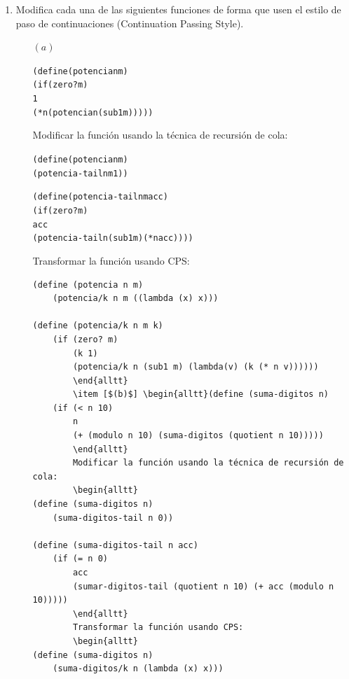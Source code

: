 \documentclass[letterpaper,11pt]{article}
\begin{document}
\begin{enumerate}
    Cuando invocamos nuestra continuación $c$ con un argumento, es equivalente a reemplazar el valor de $4$ por el valor de $c$, y así el valor de la expresión es $21$.\\
    \newpage
    \texttt{Notación $\lambda \uparrow$:}
    \begin{verbatim}
        (+ 1 (+ 2 (+ 3 (+ (let/cc k (set! c k) 4) 5))))
        (+ 1 (+ 2 (+ 3 (+ (lambda \uparrow (k) (k (+ 1 (+ 2 (+ 3 (+ 10 5))))))))))
        (k (+ 1 (+ 2 (+3 (+ 10 5)))))
        (k 21) = 21
    \end{verbatim}
    
    \item Modifica cada una de las siguientes funciones de forma que usen el estilo de paso de continuaciones (Continuation Passing Style).
    \begin{itemize}
        \item [$(a)$] \begin{alltt}(define (potencia n m)
    (if (zero? m)
        1
        (* n (potencia n (sub1 m)))))
        \end{alltt}
        Modificar la función usando la técnica de recursión de cola:
        \begin{alltt}
(define (potencia n m)
    (potencia-tail n m 1))
    
(define (potencia-tail n m acc)
    (if (zero? m)
        acc
        (potencia-tail n (sub1 m) (* n acc))))
        \end{alltt}
        Transformar la función usando CPS:
        \begin{verbatim}
(define (potencia n m)
    (potencia/k n m ((lambda (x) x)))
    
(define (potencia/k n m k)
    (if (zero? m)
        (k 1)
        (potencia/k n (sub1 m) (lambda(v) (k (* n v))))))
        \end{alltt}
        \item [$(b)$] \begin{alltt}(define (suma-digitos n)
    (if (< n 10)
        n
        (+ (modulo n 10) (suma-digitos (quotient n 10)))))
        \end{alltt}
        Modificar la función usando la técnica de recursión de cola:
        \begin{alltt}
(define (suma-digitos n)
    (suma-digitos-tail n 0))
    
(define (suma-digitos-tail n acc)
    (if (= n 0)
        acc
        (sumar-digitos-tail (quotient n 10) (+ acc (modulo n 10)))))
        \end{alltt}
        Transformar la función usando CPS:
        \begin{alltt}
(define (suma-digitos n)
    (suma-digitos/k n (lambda (x) x)))
    

\end{verbatim}
\end{itemize}
\end{enumerate}
\end{document}
